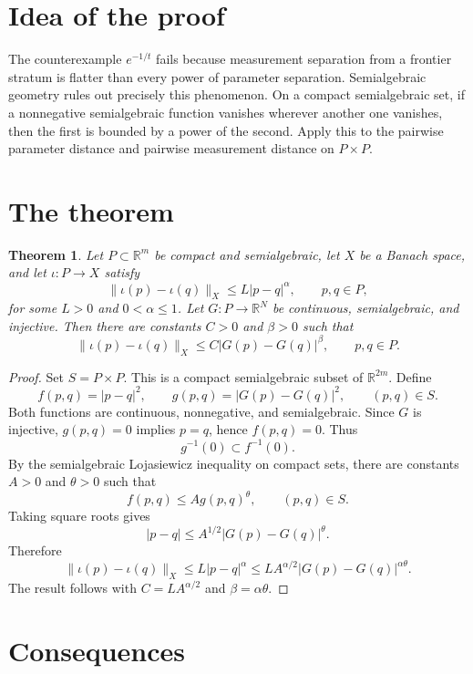 \documentclass[11pt]{article}
\newtheorem{theorem}{Theorem}
\newcommand{\R}{\mathbb R}
\begin{document}
\section{Idea of the proof}

The counterexample \(e^{-1/t}\) fails because measurement separation from a
frontier stratum is flatter than every power of parameter separation.
Semialgebraic geometry rules out precisely this phenomenon.  On a compact
semialgebraic set, if a nonnegative semialgebraic function vanishes wherever
another one vanishes, then the first is bounded by a power of the second.  Apply
this to the pairwise parameter distance and pairwise measurement distance on
\(P\times P\).

\section{The theorem}

\begin{theorem}\label{thm:semialgebraic}
Let \(P\subset\R^m\) be compact and semialgebraic, let \(X\) be a Banach space,
and let \(\iota:P\to X\) satisfy
\[
  \|\iota(p)-\iota(q)\|_X\le L |p-q|^\alpha,\qquad p,q\in P,
\]
for some \(L>0\) and \(0<\alpha\le1\).  Let \(G:P\to\R^N\) be continuous,
semialgebraic, and injective.  Then there are constants \(C>0\) and
\(\beta>0\) such that
\[
  \|\iota(p)-\iota(q)\|_X\le C |G(p)-G(q)|^\beta,\qquad p,q\in P.
\]
\end{theorem}

\begin{proof}
Set \(S=P\times P\).  This is a compact semialgebraic subset of
\(\R^{2m}\).  Define
\[
  f(p,q)=|p-q|^2,\qquad g(p,q)=|G(p)-G(q)|^2,\qquad (p,q)\in S.
\]
Both functions are continuous, nonnegative, and semialgebraic.  Since \(G\) is
injective, \(g(p,q)=0\) implies \(p=q\), hence \(f(p,q)=0\).  Thus
\[
  g^{-1}(0)\subset f^{-1}(0).
\]
By the semialgebraic Lojasiewicz inequality on compact sets, there are
constants \(A>0\) and \(\theta>0\) such that
\[
  f(p,q)\le A g(p,q)^\theta,\qquad (p,q)\in S.
\]
Taking square roots gives
\[
  |p-q|\le A^{1/2}|G(p)-G(q)|^\theta.
\]
Therefore
\[
  \|\iota(p)-\iota(q)\|_X
  \le L |p-q|^\alpha
  \le L A^{\alpha/2}|G(p)-G(q)|^{\alpha\theta}.
\]
The result follows with \(C=L A^{\alpha/2}\) and \(\beta=\alpha\theta\).
\end{proof}

\section{Consequences}
\end{document}
